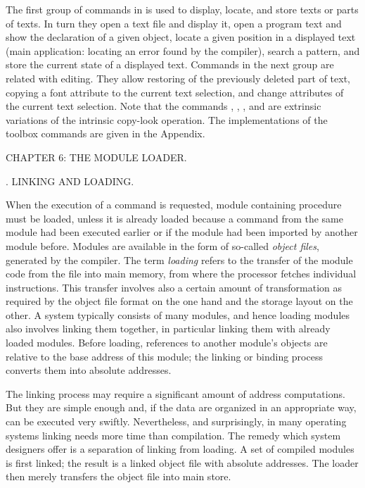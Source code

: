 \noindent The first group of commands in  is used to display, locate, and store texts or parts of texts. In turn they open a text file and display it, open a program text and show the declaration of a given object, locate a given position in a displayed text (main application: locating an error found by the compiler), search a pattern, and store the current state of a displayed text. Commands in the next group are related with editing. They allow restoring of the previously deleted part of text, copying a font attribute to the current text selection, and change attributes of the current text selection. Note that the commands , , , and  are extrinsic variations of the intrinsic copy-look operation. The implementations of the toolbox commands are given in the Appendix.

\beginchapter CHAPTER 6: THE MODULE LOADER.

. LINKING AND LOADING.

When the execution of a command  is requested, module  containing procedure  must be loaded, unless it is already loaded because a command from the same module had been executed earlier or if the module had been imported by another module before. Modules are available in the form of so-called \emph{object files}, generated by the compiler. The term \emph{loading} refers to the transfer of the module code from the file into main memory, from where the processor fetches individual instructions. This transfer involves also a certain amount of transformation as required by the object file format on the one hand and the storage layout on the other. A system typically consists of many modules, and hence loading modules also involves linking them together, in particular linking them with already loaded modules. Before loading, references to another module's objects are relative to the base address of this module; the linking or binding process converts them into absolute addresses.

The linking process may require a significant amount of address computations. But they are simple enough and, if the data are organized in an appropriate way, can be executed very swiftly. Nevertheless, and surprisingly, in many operating systems linking needs more time than compilation. The remedy which system designers offer is a separation of linking from loading. A set of compiled modules is first linked; the result is a linked object file with absolute addresses. The loader then merely transfers the object file into main store.

